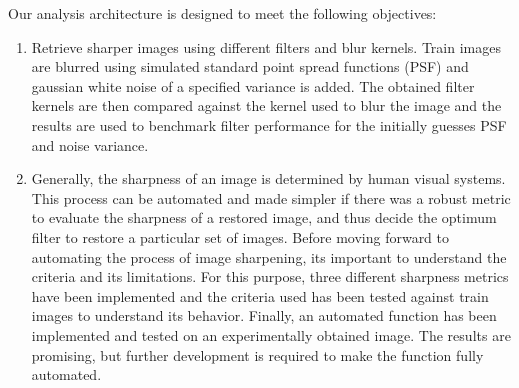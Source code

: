 \noindent Our analysis architecture is designed to meet the following objectives:
\begin{enumerate}
\item  Retrieve sharper images using different filters and blur kernels. Train images are blurred using simulated standard point spread functions (PSF) and gaussian white noise of a specified variance is added. The obtained filter kernels are then compared against the kernel used to blur the image and the results are used to benchmark filter performance for the initially guesses PSF and noise variance. 
\item Generally, the sharpness of an image is determined by human visual systems. This process can be automated and made simpler if there was a robust metric to evaluate the sharpness of a restored image, and thus decide the optimum filter to restore a particular set of images. Before moving forward to automating the process of image sharpening, its important to understand the criteria and its limitations. For this purpose, three different sharpness metrics have been implemented and the criteria used has been tested against train images to understand its behavior. Finally, an automated function has been implemented and tested on an experimentally obtained image. The results are promising, but further development is required to make the function fully automated.

\end{enumerate}